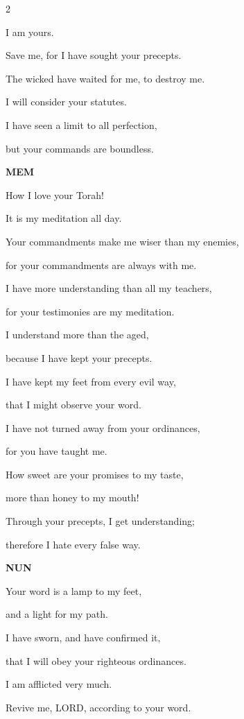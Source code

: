 \begin{multicols}{2}
	
	\myverse{}I am yours.
	
	Save me, for I have sought your precepts.
	
	
	\myverse{}The wicked have waited for me, to destroy me.
	
	I will consider your statutes.
	
	
	\myverse{}I have seen a limit to all perfection,
	
	but your commands are boundless.
	
	\vspace{\baselineskip}
	
	\textbf{MEM}
	
	
	\myverse{}How I love your Torah!
	
	It is my meditation all day.
	
	
	\myverse{}Your commandments make me wiser than my enemies,
	
	for your commandments are always with me.
	
	
	\myverse{}I have more understanding than all my teachers,
	
	for your testimonies are my meditation.
	
	
	\myverse{}I understand more than the aged,
	
	because I have kept your precepts.
	
	
	\myverse{}I have kept my feet from every evil way,
	
	that I might observe your word.
	
	
	\myverse{}I have not turned away from your ordinances,
	
	for you have taught me.
	
	
	\myverse{}How sweet are your promises to my taste,
	
	more than honey to my mouth!
	
	
	\myverse{}Through your precepts, I get understanding;
	
	therefore I hate every false way.
	
	\vspace{\baselineskip}
	\textbf{NUN}
	
	
	\myverse{}Your word is a lamp to my feet,
	
	and a light for my path.
	
	
	\myverse{}I have sworn, and have confirmed it,
	
	that I will obey your righteous ordinances.
	
	
	\myverse{}I am afflicted very much.
	
	Revive me, LORD, according to your word.
	

\end{multicols}
